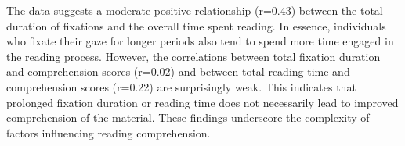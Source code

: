The data suggests a moderate positive relationship (r=0.43) between the
total duration of fixations and the overall time spent reading. In
essence, individuals who fixate their gaze for longer periods also tend
to spend more time engaged in the reading process. However, the
correlations between total fixation duration and comprehension scores
(r=0.02) and between total reading time and comprehension scores
(r=0.22) are surprisingly weak. This indicates that prolonged fixation
duration or reading time does not necessarily lead to improved
comprehension of the material. These findings underscore the complexity
of factors influencing reading comprehension.










